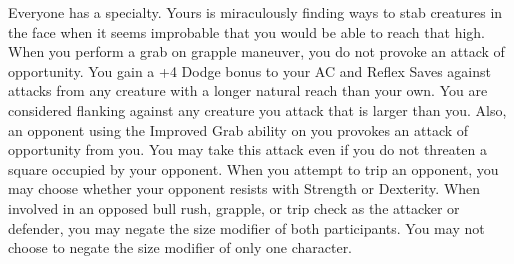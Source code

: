 \combatfeat
{Everyone has a specialty. Yours is miraculously finding ways to stab creatures in the face when it seems improbable that you would be able to reach that high.}
{When you perform a grab on grapple maneuver, you do not provoke an attack of opportunity.}
{You gain a +4 Dodge bonus to your AC and Reflex Saves against attacks from any creature with a longer natural reach than your own.}
{You are considered flanking against any creature you attack that is larger than you. Also, an opponent using the Improved Grab ability on you provokes an attack of opportunity from you. You may take this attack even if you do not threaten a square occupied by your opponent.}
{When you attempt to trip an opponent, you may choose whether your opponent resists with Strength or Dexterity.}
{When involved in an opposed bull rush, grapple, or trip check as the attacker or defender, you may negate the size modifier of both participants. You may not choose to negate the size modifier of only one character.}